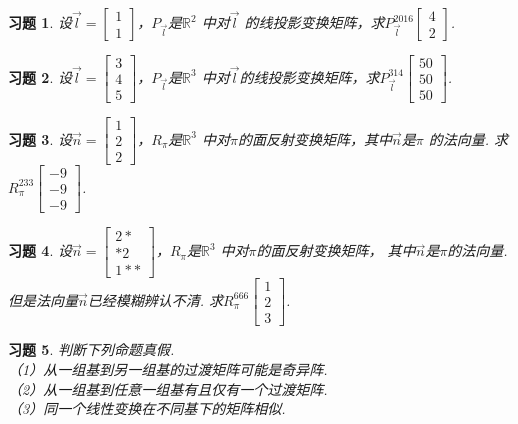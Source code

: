 \documentclass[a4paper]{book}
\newtheorem{ex}{习题}[chapter]
\begin{document}
\begin{ex}\label{8.12}
设$\vec{l}=\begin{bmatrix}1\\1\end{bmatrix}$，$P_{\vec{l}}$是$\mathbb{R}^2$ 中对$\vec{l}$ 的线投影变换矩阵，求$P_{\vec{l}}^{2016}\begin{bmatrix}4\\2\end{bmatrix}$.
\end{ex}

\begin{ex}\label{8.13}
设$\vec{l}=\begin{bmatrix}3\\4\\5\end{bmatrix}$，$P_{\vec{l}}$是$\mathbb{R}^3$ 中对$\vec{l}$的线投影变换矩阵，求$P_{\vec{l}}^{314}\begin{bmatrix}50\\50\\50\end{bmatrix}$.
\end{ex}

\begin{ex}\label{8.14}
设$\vec{n}=\begin{bmatrix}1\\2\\2\end{bmatrix}$，$R_{\pi}$是$\mathbb{R}^3$ 中对$\pi$的面反射变换矩阵，其中$\vec{n}$是$\pi$ 的法向量.
求$R_{\pi}^{233}\begin{bmatrix}-9\\-9\\-9\end{bmatrix}$.
\end{ex}

\begin{ex}\label{8.15}
设$\vec{n}=\begin{bmatrix}2*\\*2\\1**\end{bmatrix}$，$R_\pi$是$\mathbb{R}^3$ 中对$\pi$的面反射变换矩阵，
其中$\vec{n}$是$\pi$的法向量. 但是法向量$\vec{n}$已经模糊辨认不清. 求$R_{\pi}^{666}\begin{bmatrix}1\\2\\3\end{bmatrix}$.
\end{ex}

\begin{ex}\label{8.16}
判断下列命题真假.\\
（1）从一组基到另一组基的过渡矩阵可能是奇异阵.\\
（2）从一组基到任意一组基有且仅有一个过渡矩阵.\\
（3）同一个线性变换在不同基下的矩阵相似.
\end{ex}
\end{document}
